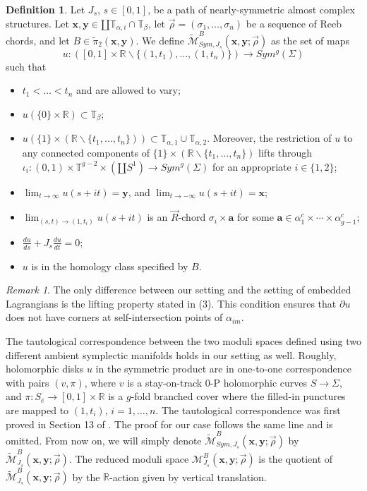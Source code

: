 \documentclass{amsart}
\theoremstyle{definition}
\newtheorem{defn}[thm]{Definition}
\theoremstyle{remark}
\newtheorem{rmk}[thm]{Remark}
\numberwithin{equation}{section}
\numberwithin{equation}{section} \makeatletter
\begin{document}
\begin{defn}\label{Definition, holomorphic disks in symmetric product}
Let $J_s$, $s\in[0,1]$, be a path of nearly-symmetric almost complex structures. Let $\bm{x},\bm{y}\in \amalg \mathbb{T}_{\alpha,i} \cap \mathbb{T}_{\beta}$, let $\overrightarrow{\rho}=(\sigma_1,\ldots,\sigma_n)$ be a sequence of Reeb chords, and let $B\in \tilde{\pi}_2(\bm{x},\bm{y})$. We define $\widetilde{\mathcal{M}}_{Sym,J_s}^B(\bm{x},\bm{y};\overrightarrow{\rho})$ as the set of maps $$u:([0,1]\times \mathbb{R}\backslash \{(1,t_1),\ldots,(1,t_n)\})\rightarrow Sym^g(\Sigma)$$ such that 
\begin{itemize}
\item[(1)]$t_1<\ldots<t_n$ and are allowed to vary;
\item[(2)]$u(\{0\}\times \mathbb{R})\subset \mathbb{T}_\beta$;
\item[(3)]$u(\{1\}\times (\mathbb{R}\backslash \{t_1,\ldots,t_n\}))\subset \mathbb{T}_{\alpha,1}\cup \mathbb{T}_{\alpha,2}$. Moreover, the restriction of $u$ to any connected components of $\{1\}\times (\mathbb{R}\backslash \{t_1,\ldots,t_n\})$ lifts through $\iota_i:(0,1)\times\mathbb{T}^{g-2}\times (\amalg S^1)\rightarrow Sym^g(\Sigma)$ for an appropriate $i\in\{1,2\}$;
\item[(4)]$\lim_{t\rightarrow\infty}u(s+it)=\bm{y}$, and $\lim_{t\rightarrow -\infty}u(s+it)=\bm{x}$;
\item[(5)]$\lim_{(s,t)\rightarrow (1,t_i)}u(s+it)$ is an $\overrightarrow{R}$-chord $\sigma_i\times \bm{a}$ for some $\bm{a}\in \alpha_1^c\times\cdots\times \alpha_{g-1}^c$;
\item[(6)]$\frac{du}{ds}+J_s\frac{du}{dt}=0$;
\item[(7)]$u$ is in the homology class specified by $B$.
\end{itemize}
\end{defn}
\begin{rmk}
The only difference between our setting and the setting of embedded Lagrangians is the lifting property stated in (3). This condition ensures that $\partial u$ does not have corners at self-intersection points of $\alpha_{im}$.
\end{rmk}
The tautological correspondence between the two moduli spaces defined using two different ambient symplectic manifolds holds in our setting as well. Roughly, holomorphic disks $u$ in the symmetric product are in one-to-one correspondence with pairs $(v,\pi)$, where $v$ is a stay-on-track 0-P holomorphic curves $S\rightarrow \Sigma$, and $\pi: S_{\bar{e}}\rightarrow [0,1]\times \mathbb{R}$ is a $g$-fold branched cover where the filled-in punctures are mapped to $(1,t_i)$, $i=1,\ldots,n$. The tautological correspondence was first proved in Section 13 of \cite{MR2240908}. The proof for our case follows the same line and is omitted. From now on, we will simply denote $\widetilde{\mathcal{M}}_{Sym,J_s}^B(\bm{x},\bm{y};\overrightarrow{\rho})$ by $\widetilde{\mathcal{M}}_{J_s}^B(\bm{x},\bm{y};\overrightarrow{\rho})$. The reduced moduli space ${\mathcal{M}}_{J_s}^B(\bm{x},\bm{y};\overrightarrow{\rho})$ is the quotient of $\widetilde{\mathcal{M}}_{J_s}^B(\bm{x},\bm{y};\overrightarrow{\rho})$ by the $\mathbb{R}$-action given by vertical translation.
\end{document}
